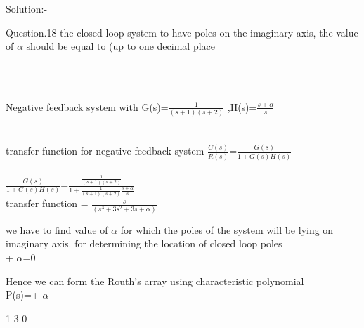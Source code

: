 \documentclass[journal,12pt,twocolumn]{IEEEtran}
\begin{document}
\begin{frame}{Solution:- }
\begin{frame}{}
\begin{frame}{Question.18 }
the closed loop system to have poles on the imaginary axis, the value of  $\alpha$ should be equal to (up to one
decimal place
\end{frame}
\\\\
\begin{frame}{}
 Negative feedback system with G(s)=$\frac{1}{(s+1)(s+2)}$ ,H(s)=$\frac{s+\alpha}{s}$
 \\\\
\\ transfer function for negative feedback system  $\frac{C(s)}{R(s)}$=$\frac{G(s)}{1+G(s)H(s)}$
\\\\
 $\frac{G(s)}{1+G(s)H(s)}$=$\frac{\frac{1}{(s+1)(s+2)}}{1+\frac{1}{(s+1)(s+2)}\frac{s+\alpha}{s}}$ 
\\
 transfer function = $\frac{s}{(s^3 +3s^2+ 3s+ \alpha)}$ 
 \\
\end{frame}
\begin{frame}{}
we have to find value of $\alpha$ for which the poles of the system will be lying on imaginary axis.
 for determining the location of closed loop poles 
\\
        + $\alpha$=0 
   \\

 \end{frame}
\begin{frame}{}

 Hence we can form the Routh’s array using characteristic polynomial  
 \\
 \hspace{3cm} P(s)=+ $\alpha$ \hfill \break
 
  \hspace{3cm}  \hspace{1cm} 1\hspace{1cm} 3\hspace{1cm} 0 \hfill \break
  

\end{frame}
\end{frame}
\end{frame}
\end{document}
